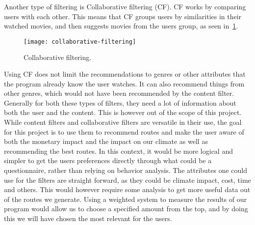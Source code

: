 Another type of filtering is Collaborative filtering (CF).
CF works by comparing users with each other.
This means that CF groups users by similarities in their watched movies, and then suggests movies from the users group,
as seen in~\ref{fig:figure4}.

\begin{figure}
    \centering
    \texttt{[image: collaborative-filtering]}
    \caption{Collaborative filtering. \cite{collaborative_filtering}}
    \label{fig:figure4}
\end{figure}

Using CF does not limit the recommendations to genres or other attributes that the program already know the user
watches.
It can also recommend things from other genres, which would not have been recommended by the content filter.
Generally for both these types of filters, they need a lot of information about both the user and the content.
This is however out of the scope of this project.
While content filters and collaborative filters are versatile in their use, the goal for this project is to use them to
recommend routes and make the user aware of both the monetary impact and the impact on our climate as well as
recommending the best routes.
In this context, it would be more logical and simpler to get the users preferences directly through what could be a
questionnaire, rather than relying on behavior analysis.
The attributes one could use for the filters are straight forward, as they could be climate impact, cost, time and
others.
This would however require some analysis to get more useful data out of the routes we generate.
Using a weighted system to measure the results of our program would allow us to choose a specified amount from the top,
and by doing this we will have chosen the most relevant for the users.
